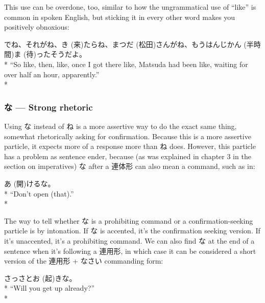 \documentclass[11pt, b5paper, twoside, openright, onecolumn]{book}
\makeatletter
\newcommand*{\rubystack}[2]{{\relscale{0.5}%
  \begin{tabular}[b]{@{}c@{}}%
    {#1}\\%
   {\textscale{2}{#2}}%
  \end{tabular}}%
}
\DeclareRobustCommand*{\ruby}[2]{%
  \mbox{%
    \setlength{\parskip}{0ex}%
    \BeginAccSupp{method=pdfstringdef,ActualText={#1}}%
      \rubystack{\phantom{#2}}{#1}%
      \llap{%
        \rubystack{#2}{\phantom{#1}}%
      }%
    \EndAccSupp{}%
  }%
}
\renewcommand*{\ruby}[2]{#2 (#1)}%
\newenvironment{exampleblock}{
\setlength{\parindent}{0.6in}
\begin{minipage}[t]{\dimexpr\textwidth-\parindent}}
{\end{minipage}}
\makeatother
\begin{document}
This use can be overdone‚ too‚ similar to how the ungrammatical use of “like” is common in spoken English‚ but sticking it in every other word makes you positively obnoxious:

\vspace{0.4cm}
\begin{exampleblock}
でね、それがね、\ruby{来}{き}たらね、\ruby{松田}{まつだ}さんがね、もう\ruby{半時間}{はんじかん}\ruby{待}{ま}ったそうだよ。 \\* 
“So like‚ then‚ like‚ once I got there like‚ Matsuda had been like‚ waiting for over half an hour‚ apparently.” \\* 
\end{exampleblock}
\subsubsection{な — Strong rhetoric}


Using な instead of ね is a more assertive way to do the exact same thing‚ somewhat rhetorically asking for confirmation. Because this is a more assertive particle‚ it expects more of a response more than ね does. However‚ this particle has a problem as sentence ender‚ because (as was explained in chapter 3 in the section on imperatives) な after a 連体形 can also mean a  command‚ such as in:

\vspace{0.4cm}
\begin{exampleblock}
\ruby{開}{あ}けるな。 \\* 
“Don’t open (that).” \\* 
\end{exampleblock}
\vspace{0.2cm}

The way to tell whether な is a prohibiting command or a confirmation-\linebreak[0]seeking particle is by intonation. If な is accented‚ it’s the confirmation seeking version. If it’s unaccented‚ it’s a prohibiting command. We can also find な at the end of a sentence when it’s following a 連用形‚ in which case it can be considered a short version of the 連用形 + なさい commanding form:

\vspace{0.4cm}
\begin{exampleblock}
さっさと\ruby{起}{お}きな。 \\* 
“Will you get up already?” \\* 
\end{exampleblock}
\vspace{0.2cm}
\end{document}
